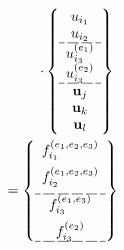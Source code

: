 \begin{multline}
	\cdot \left\{ \begin{array}{c}
		u_{i_1} \\ u_{i_2} \\ \hdashline[8pt/2pt]   u_{i_3}^{(e_1)} \\ u_{i_3}^{(e_2)} \\  \hdashline[8pt/2pt]  \mathbf{u}_{j}  \\ \mathbf{u}_{k} \\ \mathbf{u}_{l}\end{array}   \right\} \\
	= \left\{ \begin{array}{c}
		f_{i_1}^{(e_1,e_2,e_3)} \vspace{5pt} \\ f_{i_2}^{(e_1,e_2,e_3)} \vspace{5pt} \\\hdashline[8pt/2pt]  f_{i_3}^{(e_1,e_3)} \vspace{5pt} \\ f_{i_3}^{(e_2)} \\\hdashline[8pt/2pt]\end{array} \right\} \quad \quad
\end{multline}

